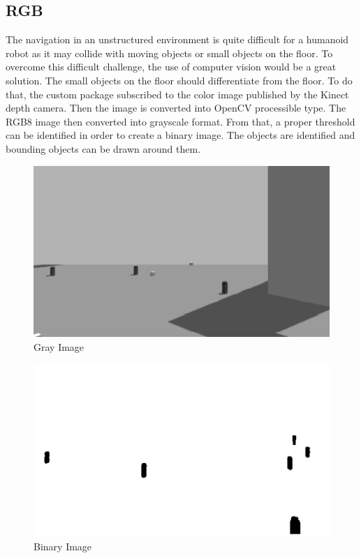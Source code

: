 \documentclass[twoside,12pt,times,onecolumn,a4paper]{report}
\begin{document}
\subsection{RGB}

The navigation in an unstructured environment is quite difficult for a humanoid robot 
as it may collide with moving objects or small objects on the floor. To overcome this 
difficult challenge, the use of computer vision would be a great solution. 
The small objects on the floor should differentiate from the floor. To do that, the 
custom package subscribed to the color image published by the Kinect depth camera. 
Then the image is converted into OpenCV processible type. The RGB8 image then 
converted into grayscale format. From that, a proper threshold can be identified in order to 
create a binary image. The objects are identified and bounding objects can be drawn 
around them.

\begin{figure}[H]
  \centering
   \includegraphics[width=15cm]{gray}
  \caption{Gray Image}
\end{figure}

\begin{figure}[H]
  \centering
   \includegraphics[width=15cm]{binary}
  \caption{Binary Image}
\end{figure}
\end{document}
